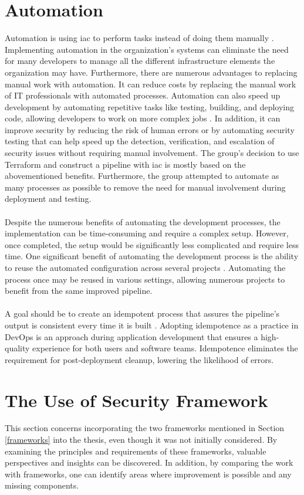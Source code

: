 \section{Automation}
Automation is using \gls{iac} to perform tasks instead of doing them manually \cite{automationredhat}. Implementing automation in the organization's systems can eliminate the need for many developers to manage all the different infrastructure elements the organization may have. Furthermore, there are numerous advantages to replacing manual work with automation. It can reduce costs by replacing the manual work of IT professionals with automated processes. Automation can also speed up development by automating repetitive tasks like testing, building, and deploying code, allowing developers to work on more complex jobs \cite{automation}. In addition, it can improve security by reducing the risk of human errors or by automating security testing that can help speed up the detection, verification, and escalation of security issues without requiring manual involvement. The group's decision to use Terraform and construct a pipeline with \gls{iac} is mostly based on the abovementioned benefits. Furthermore, the group attempted to automate as many processes as possible to remove the need for manual involvement during deployment and testing. 
\\~\\
Despite the numerous benefits of automating the development processes, the implementation can be time-consuming and require a complex setup. However, once completed, the setup would be significantly less complicated and require less time. One significant benefit of automating the development process is the ability to reuse the automated configuration across several projects \cite{reusepipeline}. Automating the process once may be reused in various settings, allowing numerous projects to benefit from the same improved \gls{pipeline}. 
\\~\\
A goal should be to create an \gls{idempotent} process that assures the pipeline's output is consistent every time it is built \cite{idempotent}. Adopting idempotence as a practice in DevOps is an approach during application development that ensures a high-quality experience for both users and software teams. Idempotence eliminates the requirement for post-deployment cleanup, lowering the likelihood of errors. 

\section{The Use of Security Framework}
This section concerns incorporating the two frameworks mentioned in Section \ref{frameworks} into the thesis, even though it was not initially considered. By examining the principles and requirements of these frameworks, valuable perspectives and insights can be discovered. In addition, by comparing the work with frameworks, one can identify areas where improvement is possible and any missing components.

